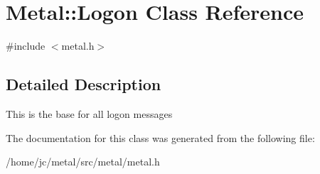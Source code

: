 \hypertarget{classMetal_1_1Logon}{}\section{Metal\+:\+:Logon Class Reference}
\label{classMetal_1_1Logon}


{\ttfamily \#include $<$metal.\+h$>$}



\subsection{Detailed Description}
This is the base for all logon messages 

The documentation for this class was generated from the following file\+:\begin{DoxyCompactItemize}
\item 
/home/jc/metal/src/metal/metal.\+h\end{DoxyCompactItemize}
